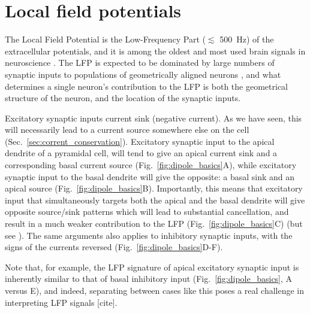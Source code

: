 \documentclass[preprint,11pt,authoryear]{elsarticle}
\newcommand{\hlb}[2][blue]{ {\sethlcolor{#1} \hl{#2}} }
\newcommand{\hlj}[2][OliveGreen]{ {\sethlcolor{#1} \hl{#2}} }
\newcommand{\ghnote}[1]{\color{white}{\hlb{GH: #1 }}\color{black}}
\newcommand{\tvnnote}[1]{\color{white}{\hlj{TVN: #1 }}\color{black}}
\begin{document}
\section{Local field potentials}


The Local Field Potential is the Low-Frequency Part ($\lesssim$ 500~Hz) of the extracellular potentials, and it is among the oldest and most used brain signals in neuroscience \citep{Einevoll2013}. The LFP is expected to be dominated by large numbers of synaptic inputs to populations of geometrically aligned neurons \citep{Nunez2006, Linden2011, Einevoll2013b}, and what determines a single neuron's contribution to the LFP is both the geometrical structure of the neuron, and the location of the synaptic inputs.  

Excitatory synaptic inputs  current sink (negative current). As we have seen, this will necessarily lead to a current source somewhere else on the cell (Sec.~\ref{sec:corrent_conservation}).  
Excitatory synaptic input to the apical dendrite of a pyramidal cell, will tend to give an apical current sink and a corresponding basal current source (Fig.~\ref{fig:dipole_basics}A), while excitatory synaptic input to the basal dendrite will give the opposite: a basal sink and an apical source (Fig.~\ref{fig:dipole_basics}B). Importantly, this means that excitatory input that simultaneously targets both the apical and the basal dendrite will give opposite source/sink patterns which will lead to substantial cancellation, and result in a much weaker contribution to the LFP (Fig.~\ref{fig:dipole_basics}C) (but see \cite{Ness2018}).
The same arguments also applies to inhibitory synaptic inputs, with the signs of the currents reversed (Fig.~\ref{fig:dipole_basics}D-F). 

Note that, for example, the LFP signature of apical excitatory synaptic input is inherently similar to that of basal inhibitory input (Fig.~\ref{fig:dipole_basics}, A versus E), and indeed, separating between cases like this poses a real challenge in interpreting LFP signals [cite]. 
\end{document}
